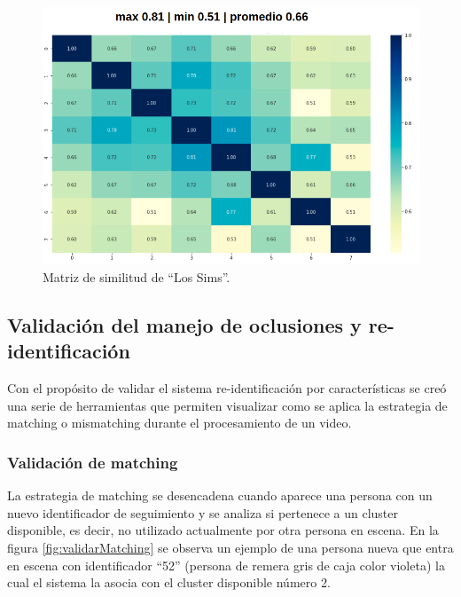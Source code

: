 \begin{figure}[ht]
	\centering
	\includegraphics[scale=.7]{./Figures/matrizSimilitud.png}
	\caption{Matriz de similitud de ``Los Sims''.}
	\label{fig:matrizSimilitud}
\end{figure}

\newpage

\subsection{Validación del manejo de oclusiones y re-identificación}

Con el propósito de validar el sistema re-identificación por características se creó una serie de herramientas que permiten visualizar como se aplica la estrategia de matching o mismatching durante el procesamiento de un video.

\subsubsection{Validación de matching}

La estrategia de matching se desencadena cuando aparece una persona con un nuevo identificador de seguimiento y se analiza si pertenece a un cluster disponible, es decir, no utilizado actualmente por otra persona en escena. En la figura \ref{fig:validarMatching} se observa un ejemplo de una persona nueva que entra en escena con identificador ``52'' (persona de remera gris de caja color violeta) la cual el sistema la asocia con el cluster disponible número 2.

